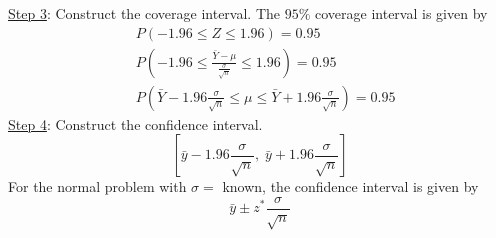 \underline{Step 3}: Construct the coverage interval. The $ 95\% $ coverage interval is given by
\begin{align*}
     & P\left( -1.96\leqslant Z\leqslant 1.96 \right)=0.95                                                                 \\
     & P\left( -1.96\leqslant \frac{\bar{Y}-\mu}{\frac{\sigma}{\sqrt{n}}}\leqslant 1.96  \right)=0.95                      \\
     & P\left( \bar{Y}-1.96 \frac{\sigma}{\sqrt{n}}\leqslant \mu\leqslant \bar{Y}+1.96 \frac{\sigma}{\sqrt{n}}\right)=0.95
\end{align*}
\underline{Step 4}: Construct the confidence interval.
\[ \left[ \bar{y}-1.96 \frac{\sigma}{\sqrt{n}} ,\; \bar{y}+1.96 \frac{\sigma}{\sqrt{n}}  \right] \]
For the normal problem with $ \sigma= $ known, the confidence interval is given by
\[ \bar{y}\pm z^* \frac{\sigma}{\sqrt{n}}  \]

